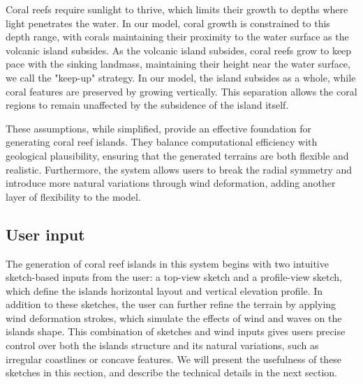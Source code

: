 \begin{Itemize}
         Coral reefs require sunlight to thrive, which limits their growth to depths where light penetrates the water. In our model, coral growth is constrained to this depth range, with corals maintaining their proximity to the water surface as the volcanic island subsides.
         As the volcanic island subsides, coral reefs grow to keep pace with the sinking landmass, maintaining their height near the water surface, we call the "keep-up" strategy. In our model, the island subsides as a whole, while coral features are preserved by growing vertically. This separation allows the coral regions to remain unaffected by the subsidence of the island itself. %
\end{Itemize}

These assumptions, while simplified, provide an effective foundation for generating coral reef islands. They balance computational efficiency with geological plausibility, ensuring that the generated terrains are both flexible and realistic. Furthermore, the system allows users to break the radial symmetry and introduce more natural variations through wind deformation, adding another layer of flexibility to the model.


\subsection{User input}

The generation of coral reef islands in this system begins with two intuitive sketch-based inputs from the user: a top-view sketch and a profile-view sketch, which define the islands horizontal layout and vertical elevation profile. In addition to these sketches, the user can further refine the terrain by applying wind deformation strokes, which simulate the effects of wind and waves on the islands shape. This combination of sketches and wind inputs gives users precise control over both the islands structure and its natural variations, such as irregular coastlines or concave features. We will present the usefulness of these sketches in this section, and describe the technical details in the next section.


